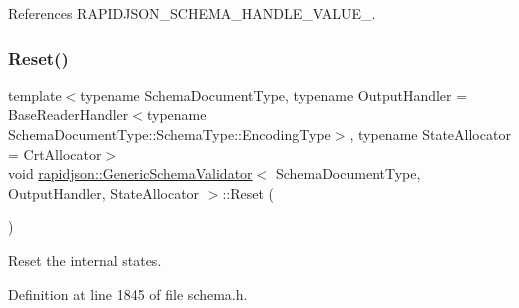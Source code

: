 References R\+A\+P\+I\+D\+J\+S\+O\+N\+\_\+\+S\+C\+H\+E\+M\+A\+\_\+\+H\+A\+N\+D\+L\+E\+\_\+\+V\+A\+L\+U\+E\+\_\+.

\mbox{\label{classrapidjson_1_1_generic_schema_validator_afe6cd0d9088a1d4cf8100c0efc9f76fc}} 
\subsubsection{\texorpdfstring{Reset()}{Reset()}}
{\footnotesize\ttfamily template$<$typename Schema\+Document\+Type, typename Output\+Handler = Base\+Reader\+Handler$<$typename Schema\+Document\+Type\+::\+Schema\+Type\+::\+Encoding\+Type$>$, typename State\+Allocator = Crt\+Allocator$>$ \\
void \mbox{\hyperlink{classrapidjson_1_1_generic_schema_validator}{rapidjson\+::\+Generic\+Schema\+Validator}}$<$ Schema\+Document\+Type, Output\+Handler, State\+Allocator $>$\+::Reset (\begin{DoxyParamCaption}{ }\end{DoxyParamCaption})}



Reset the internal states. 



Definition at line 1845 of file schema.\+h.


